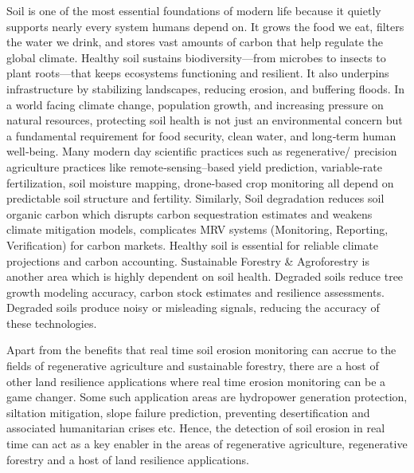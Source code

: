 \documentclass[11pt,letterpaper]{article}
\theoremstyle{plain}
\theoremstyle{definition}
\theoremstyle{remark}
\begin{document}
Soil is one of the most essential foundations of modern life because it quietly supports nearly every system humans depend on. It grows the food we eat, filters the water we drink, and stores vast amounts of carbon that help regulate the global climate. Healthy soil sustains biodiversity—from microbes to insects to plant roots—that keeps ecosystems functioning and resilient. It also underpins infrastructure by stabilizing landscapes, reducing erosion, and buffering floods. In a world facing climate change, population growth, and increasing pressure on natural resources, protecting soil health is not just an environmental concern but a fundamental requirement for food security, clean water, and long‑term human well‑being. Many modern day scientific practices such as regenerative/ precision agriculture practices like remote‑sensing–based yield prediction, variable‑rate fertilization, soil moisture mapping, drone‑based crop monitoring all depend on predictable soil structure and fertility. Similarly, Soil degradation reduces soil organic carbon which disrupts carbon sequestration estimates and weakens climate mitigation models, complicates MRV systems (Monitoring, Reporting, Verification) for carbon markets. Healthy soil is essential for reliable climate projections and carbon accounting. Sustainable Forestry \& Agroforestry is another area which is highly dependent on soil health. Degraded soils reduce tree growth modeling accuracy, carbon stock estimates and resilience assessments. Degraded soils produce noisy or misleading signals, reducing the accuracy of these technologies. 

Apart from the benefits that real time soil erosion monitoring can accrue to the fields of regenerative agriculture and sustainable forestry, there are a host of other land resilience applications where real time erosion monitoring can be a game changer. Some such application areas are hydropower generation protection, siltation mitigation, slope failure prediction, preventing desertification and associated humanitarian crises etc. Hence, the detection of soil erosion in real time can act as a key enabler in the areas of regenerative agriculture, regenerative forestry and a host of land resilience applications. 
\end{document}
